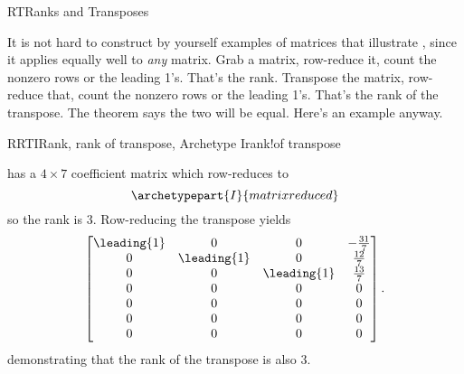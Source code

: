 \begin{subsect}{RT}{Ranks and Transposes}
%
\begin{para}It is not hard to construct by yourself examples of matrices that illustrate , since it applies equally well to {\em any} matrix.  Grab a matrix, row-reduce it, count the nonzero rows or the leading 1's.  That's the rank.  Transpose the matrix, row-reduce that, count the nonzero rows or the leading 1's.  That's the rank of the transpose.  The theorem says the two will be equal.  Here's an example anyway.\end{para}
%
\begin{example}{RRTI}{Rank, rank of transpose, Archetype I}{rank!of transpose}
\begin{para} has a $4\times 7$ coefficient matrix which row-reduces to
%
\begin{equation*}
\archetypepart{I}{matrixreduced}\end{equation*}
%
so the rank is $3$.  Row-reducing the transpose yields
%
\begin{equation*}
\begin{bmatrix}
\leading{1} & 0 & 0 & -\frac{31}{7}\\
0 & \leading{1} & 0 & \frac{12}{7}\\
0 & 0 & \leading{1} & \frac{13}{7}\\
0 & 0 & 0 & 0\\
0 & 0 & 0 & 0\\
0 & 0 & 0 & 0\\
0 & 0 & 0 & 0
\end{bmatrix}.
\end{equation*}
%
demonstrating that the rank of the transpose is also $3$.\end{para}
%
\end{example}
%
\end{subsect}
%

